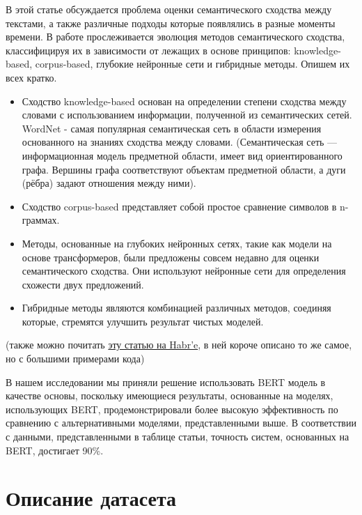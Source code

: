 \documentclass[12pt]{article}
\begin{document}
\begin{enumerate}
	В этой статье обсуждается проблема оценки семантического сходства между текстами, а также различные подходы которые появлялись в разные моменты времени. В работе прослеживается эволюция методов семантического сходства, классифицируя их в зависимости от лежащих в основе принципов: knowledge-based, corpus-based, глубокие нейронные сети и гибридные методы.
	Опишем их всех кратко.
	\begin{itemize}
		\item Сходство knowledge-based основан на определении степени сходства между словами с использованием информации, полученной из семантических сетей. WordNet - самая популярная семантическая сеть в области измерения \\ основанного на знаниях сходства между словами. (Семантическая сеть — информационная модель предметной области, имеет вид ориентированного графа. Вершины графа соответствуют объектам предметной области, а дуги (рёбра) задают отношения между ними).

		\item Сходство corpus-based представляет собой простое сравнение символов в n-граммах.

		\item Методы, основанные на глубоких нейронных сетях, такие как модели на основе трансформеров, были предложены совсем недавно для оценки \\ семантического сходства. Они используют нейронные сети для определения схожести двух предложений. 
        \newpage

		\item Гибридные методы являются комбинацией различных методов, соединяя которые, стремятся улучшить результат чистых моделей.
	\end{itemize}
	(также можно почитать \href{https://habr.com/ru/companies/skillfactory/articles/566414/}{эту статью на Habr'e}, в ней короче описано то же самое, но с большими примерами кода)
	
	В нашем исследовании мы приняли решение использовать BERT модель в качестве основы, поскольку имеющиеся результаты, основанные на моделях, использующих BERT, продемонстрировали более высокую эффективность по сравнению с альтернативными моделями, представленными выше. В соответствии с данными, представленными в таблице статьи, точность систем, основанных на BERT, достигает 90\%.
\end{enumerate}



\newpage

\section{Описание датасета}
\end{document}
